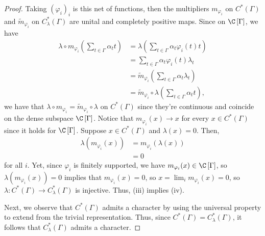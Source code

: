 \documentclass[10pt]{mypackage}
\begin{document}
\begin{proof}
  Taking $\left( \varphi_i \right)_{i}$ is this net of functions, then the multipliers $ m_{\varphi_i} $ on $C^{\ast}\left( \Gamma \right)$ and $ \widetilde{m}_{\varphi_i} $ on $C^{\ast}_{\lambda}\left( \Gamma \right)$ are unital and completely positive maps. Since on $\C\left[ \Gamma \right]$, we have
  \begin{align*}
    \lambda\circ m_{\varphi_i}\left( \sum_{t\in \Gamma}\alpha_t t \right) &= \lambda\left( \sum_{t\in \Gamma}\alpha_t\varphi_i(t)t \right)\\
                                                                          &= \sum_{t\in\Gamma}\alpha_t\varphi_i(t)\lambda_t\\
                                                                          &= \widetilde{m}_{\varphi_i} \left( \sum_{t\in \Gamma}\alpha_t\lambda_t \right)\\
                                                                          &= \widetilde{m}_{\varphi_i}\circ \lambda\left( \sum_{t\in\Gamma}\alpha_t t \right),
  \end{align*}
  we have that $\lambda\circ m_{\varphi_i} = \widetilde{m}_{\varphi_i}\circ\lambda$ on $C^{\ast}\left( \Gamma \right)$ since they're continuous and coincide on the dense subspace $\C\left[ \Gamma \right]$. Notice that $m_{\varphi_i}(x) \to x$ for every $x\in C^{\ast}\left( \Gamma \right)$ since it holds for $\C\left[ \Gamma \right]$. Suppose $x\in C^{\ast}\left( \Gamma \right)$ and $\lambda(x) = 0$. Then,
  \begin{align*}
    \lambda\left( m_{\varphi_i}(x) \right) &= m_{\varphi_i}\left( \lambda(x) \right)\\
                                           &= 0
  \end{align*}
  for all $i$. Yet, since $\varphi_i$ is finitely supported, we have $m_{\varphi_i}(x)\in \C\left[ \Gamma \right]$, so $\lambda\left( m_{\varphi_i}(x) \right) = 0$ implies that $m_{\varphi_i}(x) = 0$, so $x = \lim_{i}m_{\varphi_i}(x) = 0$, so $\lambda\colon C^{\ast}\left( \Gamma \right)\to C^{\ast}_{\lambda}\left( \Gamma \right)$ is injective. Thus, (iii) implies (iv).

  Next, we observe that $C^{\ast}\left( \Gamma \right)$ admits a character by using the universal property to extend from the trivial representation. Thus, since $C^{\ast}\left( \Gamma \right) = C^{\ast}_{\lambda}\left( \Gamma \right)$, it follows that $C^{\ast}_{\lambda}\left( \Gamma \right)$ admits a character.


\end{proof}
\end{document}
